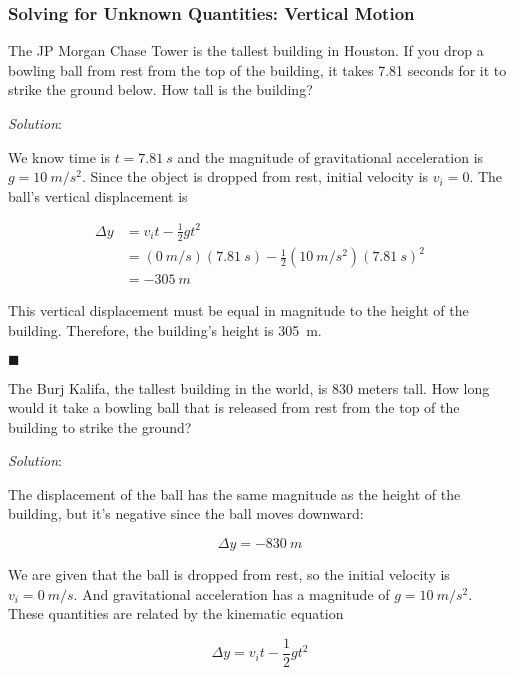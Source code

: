 \documentclass[dvipsnames]{article}
\begin{document}
\subsubsection{Solving for Unknown Quantities: Vertical Motion}

\begin{example}
    The JP Morgan Chase Tower is the tallest building in Houston. If you drop a bowling ball from rest from the top of the building, it takes 7.81 seconds for it to strike the ground below. How tall is the building?
\end{example}

\textit{Solution}:

We know time is $t = \SI{7.81}{s}$ and the magnitude of gravitational acceleration is $g = \SI{10}{m/s^2}$. Since the object is dropped from rest, initial velocity is $v_i = 0$. The ball's vertical displacement is

\begin{align*}
    \Delta y &= v_i t - \frac{1}{2}g t^2 \\[1ex]
    &= (\SI{0}{m/s})(\SI{7.81}{s}) - \frac{1}{2} (\SI{10}{m/s^2})(\SI{7.81}{s})^2 \\[1ex]
    &= -\SI{305}{m}
\end{align*}

This vertical displacement must be equal in magnitude to the height of the building. Therefore, the building's height is \SI{305}{m}.

\hfill $\blacksquare$

\begin{example}
The Burj Kalifa, the tallest building in the world, is 830 meters tall. How long would it take a bowling ball that is released from rest from the top of the building to strike the ground?
\end{example}

\textit{Solution}:

The displacement of the ball has the same magnitude as the height of the building, but it's negative since the ball moves downward:

\begin{equation*}
    \Delta y = -\SI{830}{m}
\end{equation*}

We are given that the ball is dropped from rest, so the initial velocity is $v_i = \SI{0}{m/s}$. And gravitational acceleration has a magnitude of $g = \SI{10}{m/s^2}$. These quantities are related by the kinematic equation

\begin{equation*}
    \Delta y = v_i t - \frac{1}{2}gt^2
\end{equation*}
\end{document}
